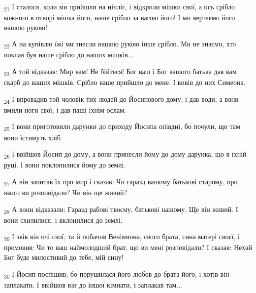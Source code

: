 \begin{tcolorbox}
\textsubscript{21} І сталося, коли ми прийшли на нічліг, і відкрили мішки свої, а ось срібло кожного в отворі мішка його, наше срібло за вагою його! І ми вертаємо його нашою рукою!
\end{tcolorbox}
\begin{tcolorbox}
\textsubscript{22} А на купівлю їжі ми знесли нашою рукою інше срібло. Ми не знаємо, хто поклав був наше срібло до наших мішків...
\end{tcolorbox}
\begin{tcolorbox}
\textsubscript{23} А той відказав: Мир вам! Не бійтеся! Бог ваш і Бог вашого батька дав вам скарб до ваших мішків. Срібло ваше прийшло до мене. І вивів до них Симеона.
\end{tcolorbox}
\begin{tcolorbox}
\textsubscript{24} І впровадив той чоловік тих людей до Йосипового дому, і дав води, а вони вмили ноги свої, і дав паші їхнім ослам.
\end{tcolorbox}
\begin{tcolorbox}
\textsubscript{25} І вони приготовили дарунки до приходу Йосипа опівдні, бо почули, що там вони їстимуть хліб.
\end{tcolorbox}
\begin{tcolorbox}
\textsubscript{26} І ввійшов Йосип до дому, а вони принесли йому до дому дарунка, що в їхній руці. І вони поклонилися йому до землі.
\end{tcolorbox}
\begin{tcolorbox}
\textsubscript{27} А він запитав їх про мир і сказав: Чи гаразд вашому батькові старому, про якого ви розповідали? Чи він ще живий?
\end{tcolorbox}
\begin{tcolorbox}
\textsubscript{28} А вони відказали: Гаразд рабові твоєму, батькові нашому. Ще він живий. І вони схилилися, і вклонилися до землі.
\end{tcolorbox}
\begin{tcolorbox}
\textsubscript{29} І звів він очі свої, та й побачив Веніямина, свого брата, сина матері своєї, і промовив: Чи то ваш наймолодший брат, що ви мені розповідали? І сказав: Нехай Бог буде милостивий до тебе, мій сину!
\end{tcolorbox}
\begin{tcolorbox}
\textsubscript{30} І Йосип поспішив, бо порушилася його любов до брата його, і хотів він заплакати. І ввійшов він до іншої кімнати, і заплакав там...
\end{tcolorbox}
